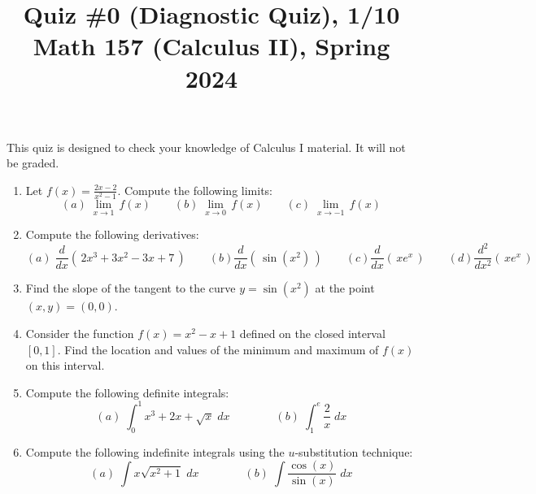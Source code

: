 \documentclass[11pt]{article}
\title{Quiz \#0 (Diagnostic Quiz), 1/10 \\ Math 157 (Calculus II), Spring 2024}
\date{}
\begin{document}
\maketitle

\thispagestyle{empty}

This quiz is designed to check your knowledge of Calculus I material. It will not be graded.

\begin{enumerate}
\item Let $\displaystyle f(x) = \frac{2x-2}{x^2-1}$. Compute the following limits:
\[ (a) \; \lim_{x \to 1} \, f(x) \qquad (b) \; \lim_{x \to 0} \, f(x) \qquad (c) \; \lim_{x \to -1} \, f(x)\]

\item Compute the following derivatives:
\[ (a) \; \frac{d}{dx}(\, 2x^3+3x^2-3x+7\, ) \qquad (b) \frac{d}{dx}(\, \sin(x^2) \,) \qquad (c) \frac{d}{dx} (\, x e^x \,) \qquad (d) \frac{d^2}{dx^2} (\, x e^x \,) \]

\item Find the slope of the tangent to the curve $y= \sin(x^2)$ at the point $(x,y) = (0,0)$.

\item Consider the function $f(x) = x^2-x+1$ defined on the closed interval $[0,1]$. Find the location and values of the minimum and maximum of $f(x)$ on this interval.

\item Compute the following definite integrals:
\[ (a) \; \int_{0}^{1} x^3 + 2x + \sqrt{x} \; dx \qquad \qquad (b) \; \int_{1}^{e} \frac{2}{x} \; dx \]

\item Compute the following indefinite integrals using the $u$-substitution technique:
\[ (a) \; \int x \sqrt{x^2+1} \; dx \qquad \qquad (b) \; \int \frac{\cos(x)}{\sin(x)} \; dx \]


\end{enumerate}
\end{document}
